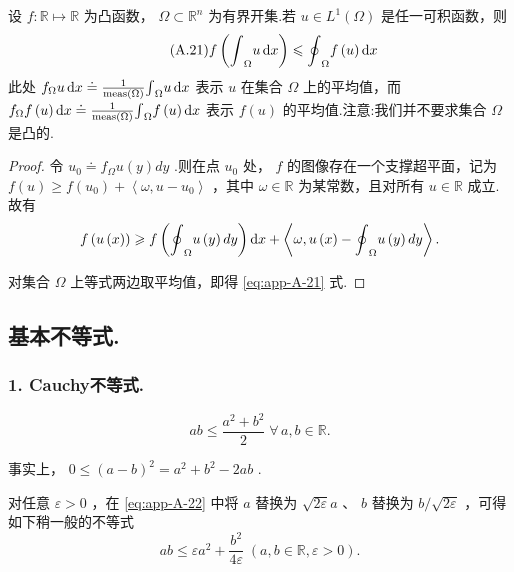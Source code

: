 \begin{theorem}[詹森不等式]\label{thm:app-A-20}
设 $f : \mathbb{R} \mapsto  \mathbb{R}$ 为凸函数， $\Omega  \subset  {\mathbb{R}}^{n}$ 为有界开集.若 $u \in  {L}^{1}\left( \Omega \right)$ 是任一可积函数，则
\begin{equation}\tag{A.21}\label{eq:app-A-21}
f\left( {{\int }_{\Omega }{u\mathop{}\!\mathrm{d} x}}\right)  \leqslant  {\oint }_{\Omega }f\left( u\right) {\mathop{}\!\mathrm{d} x}
\end{equation}
此处 ${f}_{\Omega }{u\mathop{}\!\mathrm{d} x} \doteq  \frac{1}{\operatorname{meas}\left( \Omega \right) }{\int }_{\Omega }{u\mathop{}\!\mathrm{d} x}$ 表示 $u$ 在集合 $\Omega$ 上的平均值，而 ${f}_{\Omega }f\left( u\right) {\mathop{}\!\mathrm{d} x} \doteq  \frac{1}{\operatorname{meas}\left( \Omega \right) }{\int }_{\Omega }f\left( u\right) {\mathop{}\!\mathrm{d} x}$ 表示 $f\left( u\right)$ 的平均值.注意:我们并不要求集合 $\Omega$ 是凸的.
\end{theorem}

\begin{proof}
令 ${u}_{0} \doteq  {f}_{\Omega }u\left( y\right) {dy}$ .则在点 ${u}_{0}$ 处， $f$ 的图像存在一个支撑超平面，记为 $f\left( u\right)  \geq  f\left( {u}_{0}\right)  + \left\langle  {\omega ,u - {u}_{0}}\right\rangle$ ，其中 $\omega  \in  \mathbb{R}$ 为某常数，且对所有 $u \in  \mathbb{R}$ 成立.故有
\[
f\left( {u\left( x\right) }\right)  \geqslant  f\left( {{\oint }_{\Omega }u\left( y\right) {dy}}\right) {\mathop{}\!\mathrm{d} x} + \left\langle  {\omega ,u\left( x\right)  - {\oint }_{\Omega }u\left( y\right) {dy}}\right\rangle  .
\]

对集合 $\Omega$ 上等式两边取平均值，即得 \eqref{eq:app-A-21} 式.
\end{proof}

\subsection{基本不等式.}

\subsubsection{1. Cauchy不等式.}

\begin{equation}\tag{A.22}\label{eq:app-A-22}
{ab} \leq  \frac{{a}^{2} + {b}^{2}}{2}\;\forall\,a,b \in  \mathbb{R}.
\end{equation}

事实上， $0 \leq  {\left( a - b\right) }^{2} = {a}^{2} + {b}^{2} - {2ab}$ .

对任意 $\varepsilon  > 0$ ，在 \eqref{eq:app-A-22} 中将 $a$ 替换为 $\sqrt{2\varepsilon }a$ 、 $b$ 替换为 $b/\sqrt{2\varepsilon }$ ，可得如下稍一般的不等式
\begin{equation}\tag{A.23}\label{eq:app-A-23}
{ab} \leq  \varepsilon {a}^{2} + \frac{{b}^{2}}{4\varepsilon }\;\left( {a,b \in  \mathbb{R},\varepsilon  > 0}\right) .
\end{equation}

